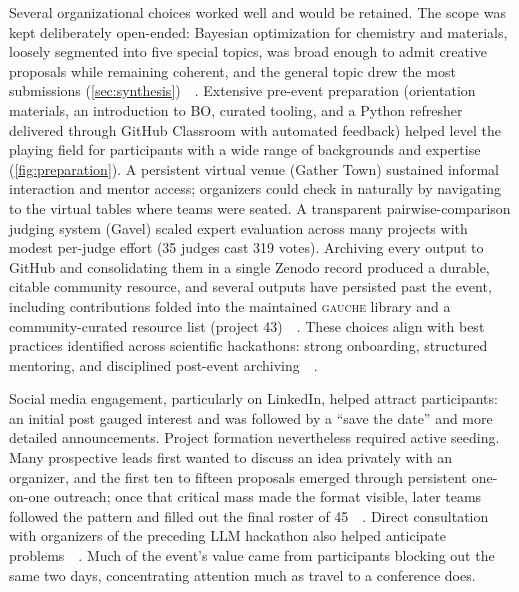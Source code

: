 \documentclass[superscriptaddress, nofootinbib,  amsmath, amssymb, twocolumn]{revtex4-2} %
\let\originalcite\cite
\renewcommand{\cite}[1]{\unskip~\originalcite{#1}}
\begin{document}
Several organizational choices worked well and would be retained. The scope was kept deliberately open-ended: Bayesian optimization for chemistry and materials, loosely segmented into five special topics, was broad enough to admit creative proposals while remaining coherent, and the general topic drew the most submissions (\cref{sec:synthesis})~\cite{baird_introduction_2024}. Extensive pre-event preparation (orientation materials, an introduction to BO, curated tooling, and a Python refresher delivered through GitHub Classroom with automated feedback) helped level the playing field for participants with a wide range of backgrounds and expertise (\cref{fig:preparation}). A persistent virtual venue (Gather Town) sustained informal interaction and mentor access; organizers could check in naturally by navigating to the virtual tables where teams were seated. A transparent pairwise-comparison judging system (Gavel) scaled expert evaluation across many projects with modest per-judge effort (35 judges cast 319 votes). Archiving every output to GitHub and consolidating them in a single Zenodo record produced a durable, citable community resource, and several outputs have persisted past the event, including contributions folded into the maintained \textsc{gauche} library and a community-curated resource list (project 43)~\cite{zimmermann_reflections_2024}. These choices align with best practices identified across scientific hackathons: strong onboarding, structured mentoring, and disciplined post-event archiving~\cite{stoltzfus_community_2017, busby_building_2015, valentine_hacktive_2025}.

Social media engagement, particularly on LinkedIn, helped attract participants: an initial post gauged interest and was followed by a ``save the date'' and more detailed announcements. Project formation nevertheless required active seeding. Many prospective leads first wanted to discuss an idea privately with an organizer, and the first ten to fifteen proposals emerged through persistent one-on-one outreach; once that critical mass made the format visible, later teams followed the pattern and filled out the final roster of 45~\cite{baird_introduction_2024}. Direct consultation with organizers of the preceding LLM hackathon also helped anticipate problems~\cite{jablonka_14_2023, baird_introduction_2024}. Much of the event's value came from participants blocking out the same two days, concentrating attention much as travel to a conference does.
\end{document}
